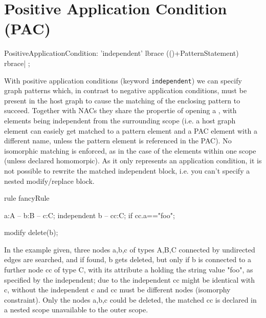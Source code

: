 
	
\section{Positive Application Condition (PAC)}
 \label{pac}

\begin{rail}  
  PositiveApplicationCondition: 
    'independent' lbrace (()+PatternStatement) rbrace|
    ;
\end{rail}

With positive application conditions (keyword \texttt{independent}) we can specify graph patterns which, in contrast to negative application conditions, must be present in the host graph to cause the matching of the enclosing pattern to succeed. Together with NACs they share the propertie of opening a , with elements being independent from the surrounding scope (i.e. a host graph element can easiely get matched to a pattern element and a PAC element with a different name, unless the pattern element is referenced in the PAC). 
No isomorphic matching is enforced, as in the case of the elements within one scope (unless declared homomorpic).
As it only represents an application condition, it is not possible to rewrite the matched independent block, i.e. you can't specify a nested modify/replace block.

\begin{example}
  \begin{grgen}

rule fancyRule
{
  a:A -- b:B -- c:C;
  independent {
    b -- cc:C;
  	if { cc.a=="foo"; }
  }
 
  modify {
    delete(b);
  }
}
  \end{grgen}

In the example given, three nodes a,b,c of types A,B,C connected by undirected edges are searched, and if found, b gets deleted, but only if b is connected to a further node cc of type C, with its attribute a holding the string value "foo", as specified 
by the independent; due to the independent cc might be identical with c, without the independent c and cc must be different nodes (isomorphy constraint). Only the nodes a,b,c could be deleted, the matched cc is declared in a nested scope unavailable to the outer scope.

\end{example}

